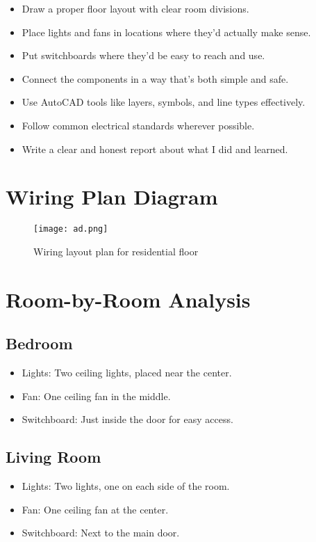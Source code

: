 \documentclass[12pt]{article}
\begin{document}
\begin{itemize}
    \item Draw a proper floor layout with clear room divisions.
    \item Place lights and fans in locations where they’d actually make sense.
    \item Put switchboards where they’d be easy to reach and use.
    \item Connect the components in a way that’s both simple and safe.
    \item Use AutoCAD tools like layers, symbols, and line types effectively.
    \item Follow common electrical standards wherever possible.
    \item Write a clear and honest report about what I did and learned.
\end{itemize}
\section*{Wiring Plan Diagram}

\begin{figure}[h!]
    \centering
    \texttt{[image: ad.png]}
    \caption{Wiring layout plan for residential floor}
    \label{fig:wiring}
\end{figure}



\section*{Room-by-Room Analysis}
\subsection*{Bedroom}
\begin{itemize}
    \item Lights: Two ceiling lights, placed near the center.
    \item Fan: One ceiling fan in the middle.
    \item Switchboard: Just inside the door for easy access.
\end{itemize}

\subsection*{Living Room}
\begin{itemize}
    \item Lights: Two lights, one on each side of the room.
    \item Fan: One ceiling fan at the center.
    \item Switchboard: Next to the main door.
\end{itemize}
\end{document}

